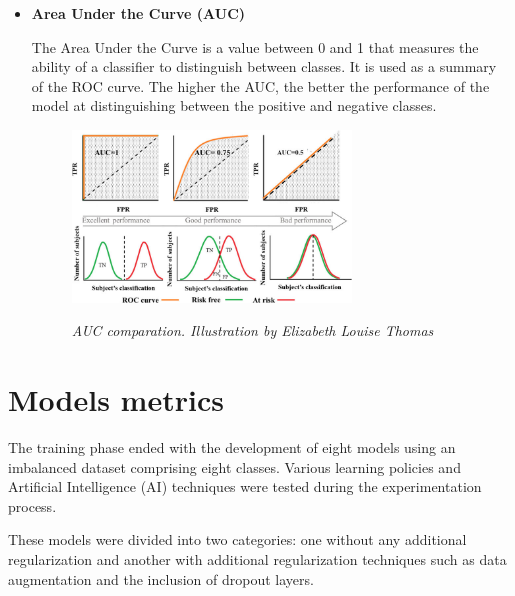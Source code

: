 \begin{itemize}
  \item {\bf Area Under the Curve (AUC)}

  The Area Under the Curve is a value between 0 and 1 that measures the
  ability of a classifier to distinguish between classes. It is used as a summary of
  the ROC curve. The higher the AUC, the better the performance of the model at
  distinguishing between the positive and negative classes.

  \begin{figure}[H]
    \centering
    \includegraphics[width=0.7\textwidth]{imatges/validation-strategy/auc.png}
    \caption[AUC-ROC performance]{\textit{AUC comparation. Illustration by Elizabeth Louise Thomas}}
    {\label{fig:auc-roc}}
  \end{figure}

\end{itemize}

\newpage

\section{Models metrics}

The training phase ended with the development of eight models using an
imbalanced dataset comprising eight classes. Various learning policies and
Artificial Intelligence (AI) techniques were tested during the experimentation
process.

These models were divided into two categories: one without any
additional regularization and another with additional regularization techniques
such as data augmentation and the inclusion of dropout layers.

